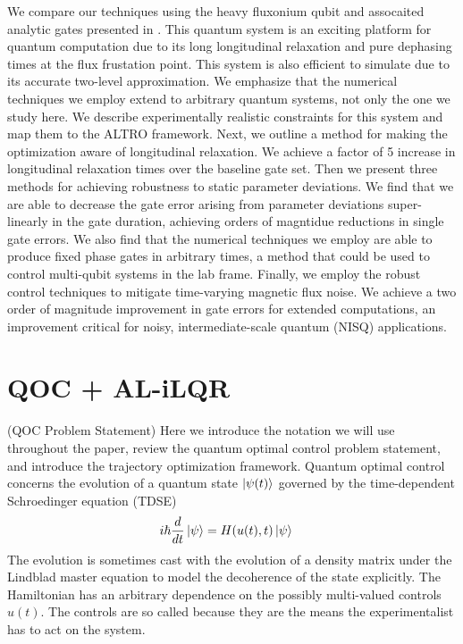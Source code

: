 \documentclass[
  amsfonts,
  amsmath,
  tbtags,
  amssymb,
  aps,
  nobibnotes,
  twocolumn,
  superscriptaddress,
]{revtex4-2}
\begin{document}
We compare our techniques using the heavy fluxonium qubit and assocaited analytic gates
presented in \cite{zhang2020universal}. This quantum system is an exciting
platform for quantum computation due to its long longitudinal relaxation
and pure dephasing times at the flux frustation point. This system is also
efficient to simulate due to its accurate two-level approximation.
We emphasize that the numerical techniques we employ extend to arbitrary quantum systems,
not only the one we study here. We describe experimentally realistic constraints for this system
and map them to the ALTRO framework. Next, we
outline a method for making the optimization aware of longitudinal
relaxation. We achieve a factor of 5 increase in longitudinal relaxation times
over the baseline gate set. Then we present three methods for achieving
robustness to static parameter deviations. We find that we are able to
decrease the gate error arising from parameter deviations super-linearly
in the gate duration, achieving orders of magntidue reductions in single gate errors.
We also find that the numerical techniques we employ are able to produce
fixed phase gates in arbitrary times, a method that could be used
to control multi-qubit systems in the lab frame. Finally,
we employ the robust control techniques to mitigate time-varying
magnetic flux noise. We achieve a two order of magnitude improvement
in gate errors for extended computations, an improvement critical
for noisy, intermediate-scale quantum (NISQ) applications.


\section{QOC + AL-iLQR}
(QOC Problem Statement) Here we introduce the notation
we will use throughout the paper,
review the quantum optimal control problem statement,
and introduce the trajectory optimization framework.
Quantum optimal control concerns the evolution of
a quantum state $\ket{\psi(t)}$ governed by the time-dependent
Schroedinger equation (TDSE)
\label{eq:tdse}
\begin{align}
  i \hbar \frac{d}{dt} \ket{\psi} &= H(u(t), t) \ket{\psi}
\end{align}
The evolution is sometimes cast with the evolution
of a density matrix under the Lindblad master equation to
model the decoherence of the state explicitly. The Hamiltonian
has an arbitrary dependence on the possibly multi-valued controls $u(t)$.
The controls are so called because they are the means the experimentalist has to
act on the system.
\end{document}
